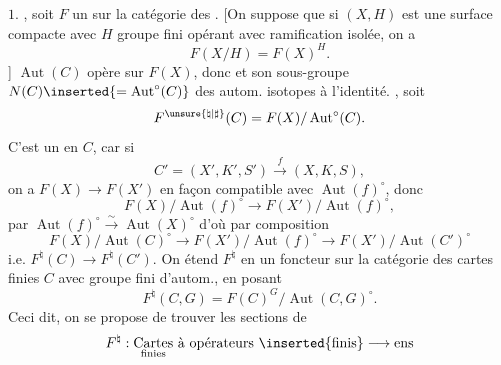 $1.$ 
, soit $F$ un  sur la catégorie des
.
[On suppose que si $(X,H)$ est une surface compacte avec $H$ groupe fini opérant avec ramification isolée, on a
\[
F(X/H)=F(X)^H.
\]
]
$\operatorname{Aut}(C)$ opère sur $F(X)$, donc et son sous-groupe $N(C)\inserted{=\operatorname{Aut}^\circ(C)}$ des autom. isotopes à l’identité.
, soit
\[
F^{\unsure{\natural|\sharp}}(C)=F(X)/\operatorname{Aut}^\circ(C).
\]
C’est un  en $C$, car si
\[
C'=(X',K',S')\xrightarrow{f}(X,K,S),
\]
on a $F(X)\to F(X')$ 
en façon compatible avec $\operatorname{Aut}(f)^\circ$, donc
\[
F(X)/\operatorname{Aut}(f)^\circ\longrightarrow F(X')/\operatorname{Aut}(f)^\circ,
\]
par $\operatorname{Aut}(f)^\circ\xrightarrow{\sim}\operatorname{Aut}(X)^\circ$ d’où par composition
\[
F(X)/\operatorname{Aut}(C)^\circ\longrightarrow F(X')/\operatorname{Aut}(f)^\circ
\longrightarrow F(X')/\operatorname{Aut}(C')^\circ
\]
i.e. $F^\natural(C)\to F^\natural(C')$.
On étend $F^\natural$ en un foncteur sur la catégorie des cartes finies $C$ avec groupe fini d’autom., en posant
\[
F^\natural(C,G)=F(C)^G/\operatorname{Aut}(C,G)^\circ.
\]
Ceci dit, on se propose de trouver les sections de 
\[
F^\natural:\underset{\text{finies}}{\text{Cartes}}\ \text{à opérateurs}\ \inserted{\text{finis}}\longrightarrow\text{ens}
\]

